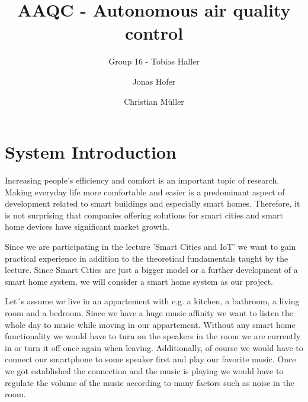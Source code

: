 \documentclass[runningheads]{llncs}
\begin{document}
%
    \title{AAQC - Autonomous air quality control}


    \author{Group 16 - Tobias Haller \and Jonas Hofer \and Christian M\"uller}


%
    \maketitle              %
%
%    


    \section{System Introduction}

    Increasing people's efficiency and comfort is an important topic of research.
    Making everyday life more comfortable and easier is a predominant aspect of development related to smart buildings and especially smart homes.
    Therefore, it is not surprising that companies offering solutions for smart cities and smart home devices have significant market growth.

    Since we are participating in the lecture 'Smart Cities and IoT' we want to gain practical experience in addition to the theoretical fundamentals taught by the lecture.
    Since Smart Cities are just a bigger model or a further development of a smart home system, we will consider a smart home system as our project.

    Let´s assume we live in an appartement with e.g. a kitchen, a bathroom, a living room and a bedroom.
    Since we have a huge music affinity we want to listen the whole day to music while moving in our appartement.
    Without any smart home functionality we would have to turn on the speakers in the room we are currently in or turn it off once again when leaving.
    Additionally, of course we would have to connect our smartphone to some speaker first and play our favorite music.
    Once we got established the connection and the music is playing we would have to regulate the volume of the music according to many factors such as noise in the room.
\end{document}
